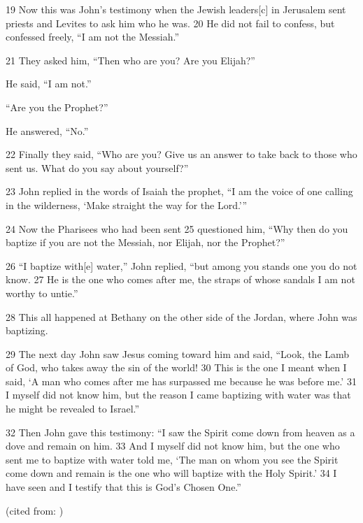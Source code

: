 \begin{englishabstract}
19 Now this was John’s testimony when the Jewish leaders[c] in Jerusalem sent priests and Levites to ask him who he was. 20 He did not fail to confess, but confessed freely, “I am not the Messiah.”

21 They asked him, “Then who are you? Are you Elijah?”

He said, “I am not.”

“Are you the Prophet?”

He answered, “No.”

22 Finally they said, “Who are you? Give us an answer to take back to those who sent us. What do you say about yourself?”

23 John replied in the words of Isaiah the prophet, “I am the voice of one calling in the wilderness, ‘Make straight the way for the Lord.’”

24 Now the Pharisees who had been sent 25 questioned him, “Why then do you baptize if you are not the Messiah, nor Elijah, nor the Prophet?”

26 “I baptize with[e] water,” John replied, “but among you stands one you do not know. 27 He is the one who comes after me, the straps of whose sandals I am not worthy to untie.”

28 This all happened at Bethany on the other side of the Jordan, where John was baptizing.

29 The next day John saw Jesus coming toward him and said, “Look, the Lamb of God, who takes away the sin of the world! 30 This is the one I meant when I said, ‘A man who comes after me has surpassed me because he was before me.’ 31 I myself did not know him, but the reason I came baptizing with water was that he might be revealed to Israel.”

32 Then John gave this testimony: “I saw the Spirit come down from heaven as a dove and remain on him. 33 And I myself did not know him, but the one who sent me to baptize with water told me, ‘The man on whom you see the Spirit come down and remain is the one who will baptize with the Holy Spirit.’ 34 I have seen and I testify that this is God’s Chosen One.”

(cited from: {})

\end{englishabstract}